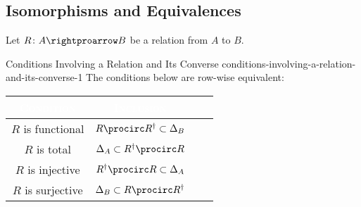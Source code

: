 \subsection{Isomorphisms and Equivalences}\label{subsection-isomorphisms-and-equivalences-in-rel}
Let $R\colon A\rightproarrow B$ be a relation from $A$ to $B$.
\begin{lemma}{Conditions Involving a Relation and Its Converse \rmI}{conditions-involving-a-relation-and-its-converse-1}%
    The conditions below are row-wise equivalent:
    \begingroup%
    \setlength\cellspacetoplimit{3pt}
    \setlength\cellspacebottomlimit{3pt}
    \renewcommand{\arraystretch}{1.2}
    \begin{center}
        \begin{tabular}{|Sc|Sc|}\hline{}
            \textcolor{white}{\textbf{\textsc{Condition}}} & \textcolor{white}{\textbf{\textsc{Inclusion}}}       \\\hline{}
            $R$ is functional                              & $R\procirc R^{\dagger}\subset \Delta_{B}$            \\
            $R$ is total                                   & $\Delta_{A}           \subset R^{\dagger}\procirc R$ \\
            $R$ is injective                               & $R^{\dagger}\procirc R\subset \Delta_{A}$            \\
            $R$ is surjective                              & $\Delta_{B}           \subset R\procirc R^{\dagger}$ \\\hline
        \end{tabular}
    \end{center}
    \endgroup
\end{lemma}
